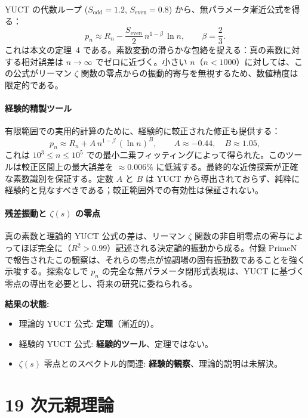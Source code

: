\documentclass[11pt,a4paper]{article}
\begin{document}
	YUCT の代数ループ (\(S_{\mathrm{odd}}=1.2\), \(S_{\mathrm{even}}=0.8\)) から、無パラメータ漸近公式を得る：
	\[
	\boxed{p_n \approx R_n - \frac{S_{\mathrm{even}}}{2}\, n^{1-\beta}\,\ln n},
	\qquad \beta = \frac{2}{3}.
	\]
	これは本文の定理~4 である。素数変動の滑らかな包絡を捉える：真の素数に対する相対誤差は \(n\to\infty\) でゼロに近づく。小さい \(n\)（\(n < 1000\)）に対しては、この公式がリーマン \(\zeta\) 関数の零点からの振動的寄与を無視するため、数値精度は限定的である。
	
	\subsection{経験的精製ツール}
	
	有限範囲での実用的計算のために、経験的に較正された修正も提供する：
	\[
	p_n \approx R_n + A\, n^{1-\beta}\,(\ln n)^B,
	\qquad A \approx -0.44,\quad B \approx 1.05,
	\]
	これは \(10^3\le n\le 10^5\) での最小二乗フィッティングによって得られた。このツールは較正区間上の最大誤差を \(\approx 0.006\%\) に低減する。最終的な近傍探索が正確な素数識別を保証する。定数 \(A\) と \(B\) は YUCT から導出されておらず、純粋に経験的と見なすべきである；較正範囲外での有効性は保証されない。
	
	\subsection{残差振動と \(\zeta(s)\) の零点}
	
	真の素数と理論的 YUCT 公式の差は、リーマン \(\zeta\) 関数の非自明零点の寄与によってほぼ完全に（\(R^2>0.99\)）記述される決定論的振動から成る。付録 PrimeN で報告されたこの観察は、それらの零点が協調場の固有振動数であることを強く示唆する。探索なしで \(p_n\) の完全な無パラメータ閉形式表現は、YUCT に基づく零点の導出を必要とし、将来の研究に委ねられる。
	
	\textbf{結果の状態:}
	\begin{itemize}
		\item 理論的 YUCT 公式: \textbf{定理}（漸近的）。
		\item 経験的 YUCT 公式: \textbf{経験的ツール}、定理ではない。
		\item \(\zeta(s)\) 零点とのスペクトル的関連: \textbf{経験的観察}、理論的説明は未解決。
	\end{itemize}
	
	\part{19 次元親理論}
	
\end{document}
